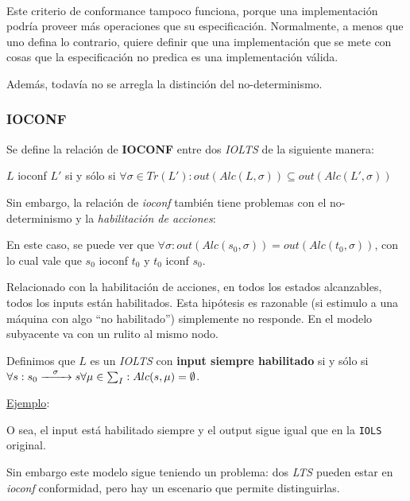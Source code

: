 \documentclass[]{article}
\begin{document}
~\newline

Este criterio de conformance tampoco funciona, porque una implementación podría proveer más operaciones que su especificación. Normalmente, a menos que uno defina lo contrario, quiere definir que una implementación que se mete con cosas que la especificación no predica es una implementación válida.

Además, todavía no se arregla la distinción del no-determinismo.

\subsubsection{IOCONF}
Se define la relación de \textbf{IOCONF} entre dos \textit{IOLTS} de la siguiente manera:
\begin{center}
	$L$ ioconf $L'$ si y sólo si $\forall \sigma \in Tr(L'): out(Alc(L,\sigma))\subseteq out(Alc(L',\sigma))$
\end{center}

Sin embargo, la relación de \textit{ioconf} también tiene problemas con el no-determinismo y la \textit{habilitación de acciones}:

En este caso, se puede ver que $\forall \sigma : out(Alc(s_0,\sigma)) = out(Alc(t_0,\sigma))$, con lo cual vale que $s_0$ ioconf $t_0$ y $t_0$ iconf $s_0$.

Relacionado con la habilitación de acciones, en todos los estados alcanzables, todos los inputs están habilitados. Esta hipótesis es razonable (si estimulo a una máquina con algo ``no habilitado'') simplemente no responde. En el modelo subyacente va con un rulito al mismo nodo.

Definimos que $L$ es un \textit{IOLTS} con \textbf{input siempre habilitado} si y sólo si $\forall s: s_0\xrightarrow{\hspace*{0.3cm} \sigma \hspace*{0.3cm}}s \forall \mu \in \sum_I : Alc(s,\mu)=\emptyset$.
~\newline

\underline{Ejemplo}:

O sea, el input está habilitado siempre y el output sigue igual que en la \texttt{IOLS} original.

Sin embargo este modelo sigue teniendo un problema: dos \textit{LTS} pueden estar en \textit{ioconf} conformidad, pero hay un escenario que permite distinguirlas.
\end{document}
